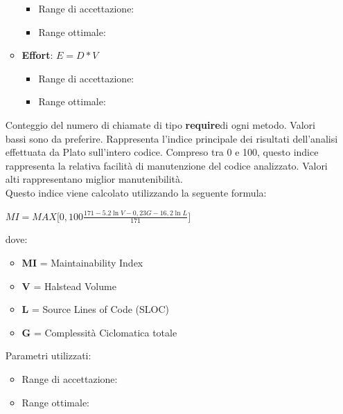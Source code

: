 \documentclass[a4paper,11pt]{article}
\begin{document}
\begin{itemize}
\begin{itemize}
\begin{itemize}
	\item Range di accettazione: \begin{math}[0 - 30]\end{math}
	\item Range ottimale: \begin{math}[0 - 15]\end{math}
	\end{itemize}
\item \textbf{Effort}: 
\begin{math}
E = D * V
\end{math}
\begin{itemize}
	\item Range di accettazione: \begin{math}[0 - 400]\end{math}
	\item Range ottimale: \begin{math}[0 - 300]\end{math}
	\end{itemize}
\end{itemize} 
Conteggio del numero di chiamate di tipo \textbf{require}\addglos di ogni metodo. Valori bassi sono da preferire.
 Rappresenta l'indice principale dei risultati dell'analisi effettuata da Plato sull'intero codice. Compreso tra 0 e 100, questo indice rappresenta la relativa facilità di manutenzione del codice analizzato. Valori alti rappresentano miglior manutenibilità.\\
Questo indice viene calcolato utilizzando la seguente formula: \\
\begin{center}
\begin{math}
MI = MAX\bigg[ 0,100 \frac{171-5.2\ln V - 0,23G - 16,2\ln L}{171} \bigg]
\end{math}
\end{center}
dove: 
\begin{itemize}
\item \textbf{MI} = Maintainability Index
\item \textbf{V} = Halstead Volume
\item \textbf{L} = Source Lines of Code (SLOC)
\item \textbf{G} = Complessità Ciclomatica totale
\end{itemize}
Parametri utilizzati: 
\begin{itemize}
	\item Range di accettazione: \begin{math}[20 - 100]\end{math}
	\item Range ottimale: \begin{math}[70 - 100]\end{math}
	\end{itemize}


\end{itemize}
\end{document}
